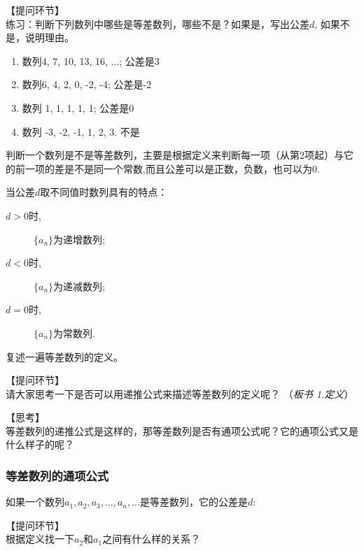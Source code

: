\documentclass[10pt,a4paper]{article}
\begin{document}
			【提问环节】\\
			练习：判断下列数列中哪些是等差数列，哪些不是？如果是，写出公差$d$, 如果不是，说明理由。 

			\begin{enumerate}
				\item 数列4, 7, 10, 13, 16, $\ldots$; \hspace{10pt} 公差是3
				\item 数列6, 4, 2, 0, -2, -4; \hspace{10pt} 公差是-2
				\item 数列 1, 1, 1, 1, 1; \hspace{10pt} 公差是0
				\item 数列 -3, -2, -1, 1, 2, 3. \hspace{10pt} 不是
			\end{enumerate}

			判断一个数列是不是等差数列，主要是根据定义来判断每一项（从第2项起）与它的前一项的差是不是同一个常数,而且公差可以是正数，负数，也可以为0.

			当公差$d$取不同值时数列具有的特点： 

			\begin{description}
				\item[$d>0$时,] $\{a_n\}$为递增数列; 
				\item[$d<0$时,] $\{a_n\}$为递减数列; 
				\item[$d=0$时,] $\{a_n\}$为常数列. 
			\end{description}

			复述一遍等差数列的定义。

			【提问环节】\\
			请大家思考一下是否可以用递推公式来描述等差数列的定义呢？ （\emph{板书 1.定义}）


			【思考】\\
			等差数列的递推公式是这样的，那等差数列是否有通项公式呢？它的通项公式又是什么样子的呢？


			\subsubsection{等差数列的通项公式} 

				如果一个数列$a_1, a_2, a_3, \ldots, a_n, \ldots $是等差数列，它的公差是$d$: 

				【提问环节】\\
				根据定义找一下$a_2$和$a_1$之间有什么样的关系？
\end{document}
